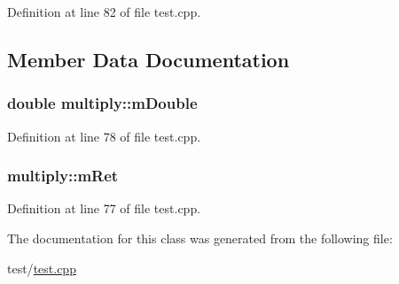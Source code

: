 Definition at line 82 of file test.\+cpp.



\subsection{Member Data Documentation}
\subsubsection[{\texorpdfstring{m\+Double}{mDouble}}]{\setlength{\rightskip}{0pt plus 5cm}double multiply\+::m\+Double}\hypertarget{classmultiply_a80fa38e5fff016704235b7064b072995}{}\label{classmultiply_a80fa38e5fff016704235b7064b072995}


Definition at line 78 of file test.\+cpp.

\subsubsection[{\texorpdfstring{m\+Ret}{mRet}}]{ multiply\+::m\+Ret}\hypertarget{classmultiply_a18d3f18c7c8bb8c35395bdb0e86196ee}{}\label{classmultiply_a18d3f18c7c8bb8c35395bdb0e86196ee}


Definition at line 77 of file test.\+cpp.



The documentation for this class was generated from the following file\+:\begin{DoxyCompactItemize}
\item 
test/\hyperlink{test_8cpp}{test.\+cpp}\end{DoxyCompactItemize}
